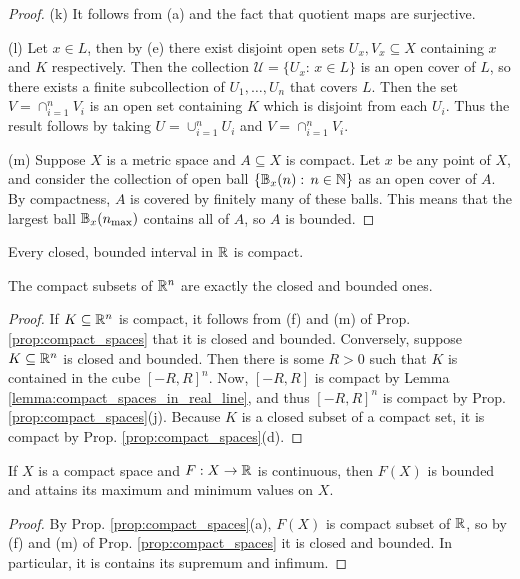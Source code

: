 \documentclass[11pt,a4paper]{article}
\begin{document}
\begin{proof}
\noindent(k) It follows from (a) and the fact that quotient maps are surjective.

\noindent(l) Let $x\in L$, then by (e) there exist disjoint open sets $U_x, V_x\subseteq X$ containing $x$ and $K$ respectively. Then the collection $\mathcal{U} = \{U_x:\,x\in L\}$ is an open cover of $L$, so there exists a finite subcollection of $U_1,\ldots,U_n$ that covers $L$. Then the set $V = \cap_{i=1}^n V_i$ is an open set containing $K$ which is disjoint from each $U_i$. Thus the result follows by taking $U = \cup_{i=1}^n U_i$ and $V = \cap_{i=1}^n V_i$.

\noindent(m) Suppose $X$ is a metric space and $A\subseteq X$ is compact. Let $x$ be any point of $X$, and consider the collection of open ball $\{\mathbb{B}_{x}(n):\,n\in\mathbb{N}\}$ as an open cover of $A$. By compactness, $A$ is covered by finitely many of these balls. This means that the largest ball $\mathbb{B}_{x}(n_{\text{max}})$ contains all of $A$, so $A$ is bounded.
\end{proof}

\begin{lemma}\label{lemma:compact_spaces_in_real_line}
Every closed, bounded interval in $\mathbb{R}$ is compact.
\end{lemma}

\begin{proposition}
The compact subsets of $\mathbb{R}^n$ are exactly the closed and bounded ones.
\end{proposition}

\begin{proof}
If $K\subseteq \mathbb{R}^n$ is compact, it follows from (f) and (m) of Prop. \ref{prop:compact_spaces} that it is closed and bounded. Conversely, suppose $K\subseteq \mathbb{R}^n$ is closed and bounded. Then there is some $R>0$ such that $K$ is contained in the cube $[-R,R]^n$. Now, $[-R,R]$ is compact by Lemma \ref{lemma:compact_spaces_in_real_line}, and thus $[-R,R]^n$ is compact by Prop. \ref{prop:compact_spaces}(j). Because $K$ is a closed subset of a compact set, it is compact by Prop. \ref{prop:compact_spaces}(d).
\end{proof}

\begin{proposition}
If $X$ is a compact space and $F:X\rightarrow \mathbb{R}$ is continuous, then $F(X)$ is bounded and attains its maximum and minimum values on $X$.
\end{proposition}

\begin{proof}
By Prop. \ref{prop:compact_spaces}(a), $F(X)$ is compact subset of $\mathbb{R}$, so by (f) and (m) of Prop. \ref{prop:compact_spaces} it is closed and bounded. In particular, it is contains its supremum and infimum.
\end{proof}
\end{document}
